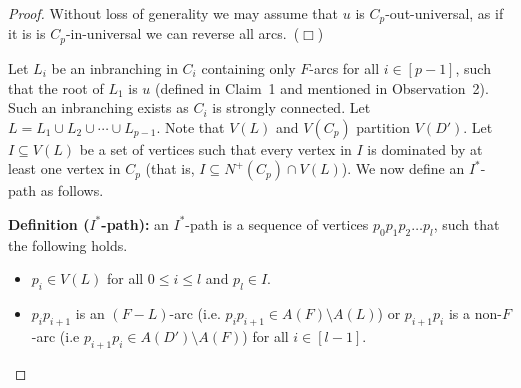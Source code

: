 \documentclass{article}
\newcommand{\smallqed}{\hfill {\tiny ($\Box$)}}
\newcommand{\2}{\vspace{2mm}}
\theoremstyle{plain}
\theoremstyle{definition}
\newcommand{\greencolor}{green}
\newcommand{\greenline}{solid}
\newcommand{\bluecolor}{blue}
\newcommand{\blueline}{solid}
\newcommand{\thickline}{thin}
\begin{document}
\begin{proof}
Without loss of generality we may assume that $u$ is $C_p$-out-universal, as if it is is $C_p$-in-universal
we can reverse all arcs.~\smallqed{}

\2

Let $L_i$ be an inbranching in $C_i$ containing only $F$-arcs for all $i \in [p-1]$, such that the root of $L_1$ is $u$ (defined in Claim~1 and mentioned in Observation~2).  Such an inbranching 
exists as $C_i$ is strongly connected. Let $L = L_1 \cup L_2 \cup \cdots \cup L_{p-1}$. Note that $V(L)$ and $V(C_p)$
partition $V(D')$. Let $I \subseteq V(L)$ be a set of vertices such that every vertex in $I$ is dominated by at least one vertex 
in $C_p$ (that is, $I \subseteq N^+(C_p) \cap V(L)$). We now define an $I^*$-path as follows.

\2

{\bf Definition ($I^*$-path):} an $I^*$-path is a sequence of vertices $p_0 p_1 p_2 \ldots p_l$, such that the following holds.

\begin{itemize}
\item $p_i \in V(L)$ for all $0 \leq i \leq l$ and $p_l \in I$.
\item $p_i p_{i+1}$ is an $(F-L)$-arc (i.e. $p_i p_{i+1} \in A(F) \setminus A(L)$) 
      or $p_{i+1} p_i$ is a non-$F$-arc (i.e $p_{i+1} p_i \in A(D') \setminus A(F)$) for all $i \in [l-1]$.
\end{itemize}

\begin{figure}
\centering
{}
\end{figure}
\end{proof}
\end{document}
